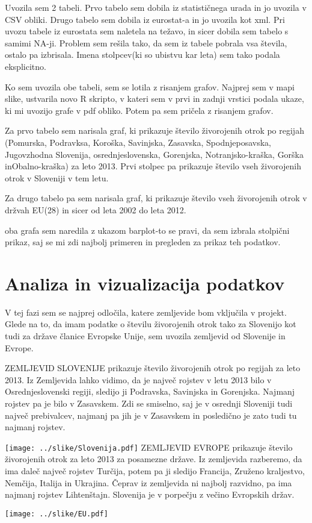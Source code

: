 \documentclass[11pt,a4paper]{article}
\begin{document}
Uvozila sem 2 tabeli. Prvo tabelo sem dobila iz statističnega urada in jo uvozila v CSV obliki. Drugo tabelo sem dobila iz eurostat-a in jo uvozila kot xml.
Pri uvozu tabele iz eurostata sem naletela na težavo, in sicer dobila sem tabelo s samimi NA-ji. Problem sem rešila tako, da sem iz tabele pobrala vsa števila, ostalo pa izbrisala. Imena stolpcev(ki so ubistvu kar leta) sem tako podala eksplicitno.

Ko sem uvozila obe tabeli, sem se lotila z risanjem grafov. Najprej sem v mapi slike, ustvarila novo R skripto, v kateri sem v prvi in zadnji vrstici podala ukaze, ki mi uvozijo grafe v pdf obliko. Potem pa sem pričela z risanjem grafov.

Za prvo tabelo sem narisala graf, ki prikazuje število živorojenih otrok po regijah (Pomurska, Podravksa, Koroška, Savinjska, Zasavska, Spodnjeposavska, Jugovzhodna Slovenija, osrednjeslovenska, Gorenjska, Notranjsko-kraška, Gorška inObalno-kraška) za leto 2013. Prvi stolpec pa prikazuje število vseh živorojenih otrok v Sloveniji  v tem letu.

Za drugo tabelo pa sem narisala graf, ki prikazuje število vseh živorojenih otrok v držvah EU(28) in sicer od leta 2002 do leta 2012.

oba grafa sem naredila z ukazom barplot-to se pravi, da sem izbrala stolpični prikaz, saj se mi zdi najbolj primeren in pregleden za prikaz teh podatkov.



\newpage
\section{Analiza in vizualizacija podatkov}



V tej fazi sem se najprej odločila, katere zemljevide bom vključila v projekt. Glede na to, da imam podatke o številu živorojenih otrok tako za Slovenijo kot tudi za države članice Evropske Unije, sem uvozila zemljevid od Slovenije in Evrope.

ZEMLJEVID SLOVENIJE prikazuje število živorojenih otrok po regijah za leto 2013. Iz Zemljevida lahko vidimo, da je največ rojstev v letu 2013 bilo v Osrednjeslovenski regiji, sledijo ji Podravska, Savinjska in Gorenjska. Najmanj rojstev pa je bilo v Zasavskem. Zdi se smiselno, saj je v osrednji Sloveniji tudi največ prebivalcev, najmanj pa jih je v Zasavskem in posledično je zato tudi tu najmanj rojstev.

\texttt{[image: ../slike/Slovenija.pdf]}
\newpage
ZEMLJEVID EVROPE prikazuje število živorojenih otrok za leto 2013 za posamezne države. Iz zemljevida razberemo, da ima daleč največ rojstev Turčija, potem pa ji sledijo Francija, Zruženo kraljestvo, Nemčija, Italija in Ukrajina. Čeprav iz zemljevida ni najbolj razvidno, pa ima najmanj rojstev Lihtenštajn. Slovenija je v porpečju z večino Evropskih držav.

\texttt{[image: ../slike/EU.pdf]}

% 
% 
% 
\end{document}
